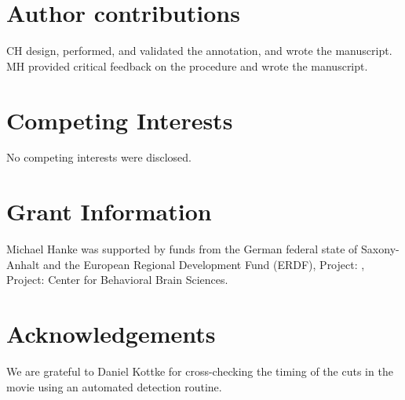 \documentclass[10pt,a4paper,twocolumn]{article}
\begin{document}
\section*{Author contributions}
CH design, performed, and validated the annotation, and wrote the manuscript.
MH provided critical feedback on the procedure and wrote the manuscript.

\section*{Competing Interests}
No competing interests were disclosed.

\section*{Grant Information}

Michael Hanke was supported by funds from the German federal state of
Saxony-Anhalt and the European Regional Development Fund (ERDF), Project: ,
Project: Center for Behavioral Brain Sciences.

\section*{Acknowledgements}
We are grateful to Daniel Kottke for cross-checking the timing of the cuts in
the movie using an automated detection routine.

{\small
}
\end{document}
